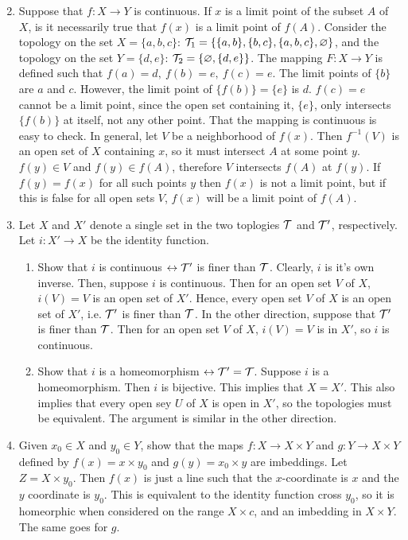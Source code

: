 \documentclass[12pt,letterpaper]{article}
\begin{document}
\RaggedRight
\begin{enumerate}
  \setcounter{enumi}{1}
  \item Suppose that $f: X\rightarrow Y$ is continuous. If $x$ is a limit point of the subset $A$ of $X$, is it necessarily true that $f(x)$ is a limit point of $f(A)$.\n
  \indent Consider the topology on the set $X=\{a,b,c\}$: $\mathcal{T}_1 = \{\{a,b\}, \{b,c\},\{a,b,c\},\varnothing\}$, and the topology on the set $Y=\{d,e\}$: $\mathcal{T}_2 = \{\varnothing, \{d,e\}\}$. The mapping $F: X\rightarrow Y$ is defined such that $f(a)=d,\ f(b)=e,\ f(c)=e$. The limit points of $\{b\}$ are $a$ and $c$. However, the limit point of $\{f(b)\}=\{e\}$ is $d$. $f(c)=e$ cannot be a limit point, since the open set containing it, $\{e\}$, only intersects $\{f(b)\}$ at itself, not any other point. That the mapping is continuous is easy to check.\n
  \indent In general, let $V$ be a neighborhood of $f(x)$. Then $f^{-1}(V)$ is an open set of $X$ containing $x$, so it must intersect $A$ at some point $y$. $f(y)\in V$ and $f(y)\in f(A)$, therefore $V$ intersects $f(A)$ at $f(y)$. If $f(y)=f(x)$ for all such points $y$ then $f(x)$ is not a limit point, but if this is false for all open sets $V$, $f(x)$ will be a limit point of $f(A)$.
  \item Let $X$ and $X'$ denote a single set in the two toplogies $\mathcal{T}$ and $\mathcal{T}'$, respectively. Let $i: X'\rightarrow X$ be the identity function.
  \begin{enumerate}
    \item Show that $i$ is continuous $\leftrightarrow \mathcal{T}'$ is finer than $\mathcal{T}$.\hspace{5in}\n
    \indent Clearly, $i$ is it's own inverse. Then, suppose $i$ is continuous. Then for an open set $V$ of $X$, $i(V)=V$ is an open set of $X'$. Hence, every open set $V$ of $X$ is an open set of $X'$, i.e. $\mathcal{T}'$ is finer than $\mathcal{T}$. \n
    \indent In the other direction, suppose that $\mathcal{T}'$ is finer than $\mathcal{T}$. Then for an open set $V$ of $X$, $i(V)=V$ is in $X'$, so $i$ is continuous.
    \item Show that $i$ is a homeomorphism $\leftrightarrow \mathcal{T}'=\mathcal{T}$.\hspace{5in}\n
    \indent Suppose $i$ is a homeomorphism. Then $i$ is bijective. This implies that $X=X'$. This also implies that every open sey $U$ of $X$ is open in $X'$, so the topologies must be equivalent. The argument is similar in the other direction.
  \end{enumerate}
  \item Given $x_0\in X$ and $y_0\in Y$, show that the maps $f: X\rightarrow X\times Y$ and $g: Y\rightarrow X\times Y$ defined by $f(x)=x\times y_0$ and $g(y)=x_0\times y$ are imbeddings. \hspace{5in}\n
  \indent Let $Z=X\times y_0$. Then $f(x)$ is just a line such that the $x$-coordinate is $x$ and the $y$ coordinate is $y_0$. This is equivalent to the identity function cross $y_0$, so it is homeorphic when considered on the range $X \times c$, and an imbedding in $X\times Y$. The same goes for $g$.



\end{enumerate}
\end{document}
